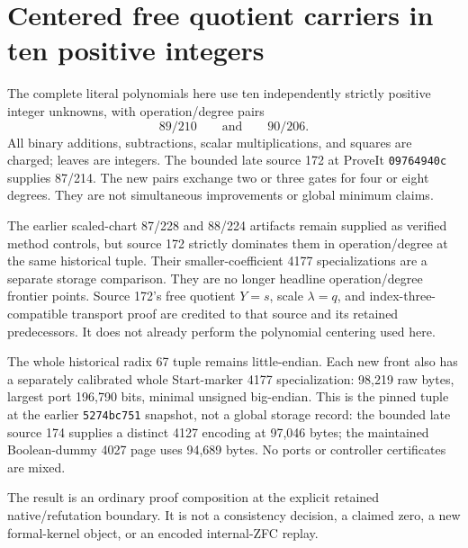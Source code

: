 \section{Centered free quotient carriers in ten positive integers}
The complete literal polynomials here use ten independently strictly positive
integer unknowns, with operation/degree pairs
\[
 89/210\qquad\text{and}\qquad90/206.
\]
All binary additions, subtractions, scalar multiplications, and squares are
charged; leaves are integers. The bounded late source 172 at ProveIt
\texttt{09764940c} supplies 87/214.
The new pairs exchange two or three gates for four or eight degrees.
They are not simultaneous improvements or global minimum claims.

The earlier scaled-chart 87/228 and 88/224 artifacts remain supplied as
verified method controls, but source 172 strictly dominates them in
operation/degree at the same historical tuple. Their smaller-coefficient
4177 specializations are a separate storage comparison. They are no longer
headline operation/degree frontier points. Source 172's
free quotient $Y=s$, scale $\lambda=q$, and index-three-compatible
transport proof are credited to that source and its retained predecessors.
It does not already perform the polynomial centering used here.

The whole historical radix 67 tuple remains little-endian. Each new front
also has a separately calibrated whole Start-marker 4177 specialization:
98,219 raw bytes, largest port 196,790 bits, minimal unsigned big-endian.
This is the pinned tuple at the earlier \texttt{5274bc751} snapshot, not a
global storage record: the bounded late source 174 supplies a distinct 4127
encoding at 97,046 bytes; the maintained Boolean-dummy 4027 page uses 94,689 bytes. No ports or controller certificates are mixed.

The result is an ordinary proof composition at the explicit retained
native/refutation boundary. It is not a consistency decision, a claimed
zero, a new formal-kernel object, or an encoded internal-ZFC replay.

